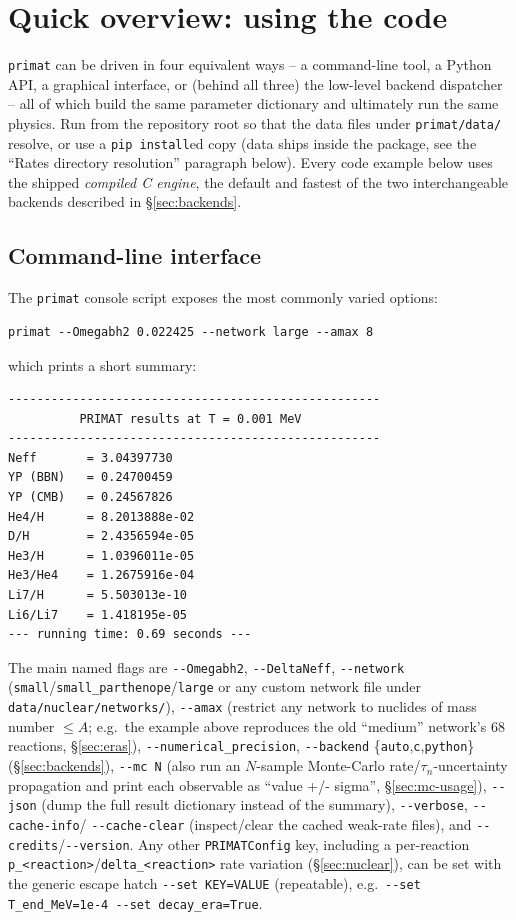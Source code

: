 \documentclass[11pt,a4paper]{article}
\newcommand{\code}[1]{\texttt{#1}}
\begin{document}
\section{Quick overview: using the code}\label{sec:usage}

\code{primat} can be driven in four equivalent ways -- a command-line tool, a
Python API, a graphical interface, or (behind all three) the low-level
backend dispatcher -- all of which build the same parameter dictionary and
ultimately run the same physics. Run from the repository root so that the
data files under \code{primat/data/} resolve, or use a \code{pip install}ed
copy (data ships inside the package, see the ``Rates directory resolution''
paragraph below). Every code example below uses the shipped \emph{compiled C
engine}, the default and fastest of the two interchangeable backends
described in \S\ref{sec:backends}.

\subsection{Command-line interface}
The \code{primat} console script exposes the most commonly varied options:
\begin{lstlisting}[style=sh]
primat --Omegabh2 0.022425 --network large --amax 8
\end{lstlisting}
which prints a short summary:
\begin{lstlisting}[style=sh]
----------------------------------------------------
          PRIMAT results at T = 0.001 MeV
----------------------------------------------------
Neff       = 3.04397730
YP (BBN)   = 0.24700459
YP (CMB)   = 0.24567826
He4/H      = 8.2013888e-02
D/H        = 2.4356594e-05
He3/H      = 1.0396011e-05
He3/He4    = 1.2675916e-04
Li7/H      = 5.503013e-10
Li6/Li7    = 1.418195e-05
--- running time: 0.69 seconds ---
\end{lstlisting}
The main named flags are \code{-{}-Omegabh2}, \code{-{}-DeltaNeff},
\code{-{}-network} (\code{small}/\code{small\_parthenope}/\code{large} or any
custom network file under \code{data/nuclear/networks/}), \code{-{}-amax}
(restrict any network to nuclides of mass number $\le A$; e.g.\ the example
above reproduces the old ``medium'' network's 68 reactions, \S\ref{sec:eras}),
\code{-{}-numerical\_precision}, \code{-{}-backend}
\{\code{auto},\code{c},\code{python}\} (\S\ref{sec:backends}),
\code{-{}-mc N} (also run an $N$-sample Monte-Carlo rate/$\tau_n$-uncertainty
propagation and print each observable as ``value +/- sigma'',
\S\ref{sec:mc-usage}), \code{-{}-json} (dump the full result dictionary
instead of the summary), \code{-{}-verbose}, \code{-{}-cache-info}/
\code{-{}-cache-clear} (inspect/clear the cached weak-rate files), and
\code{-{}-credits}/\code{-{}-version}. Any other \code{PRIMATConfig} key,
including a per-reaction \code{p\_<reaction>}/\code{delta\_<reaction>} rate
variation (\S\ref{sec:nuclear}), can be set with the generic escape hatch
\code{-{}-set KEY=VALUE} (repeatable), e.g.\
\code{-{}-set T\_end\_MeV=1e-4 -{}-set decay\_era=True}.
\end{document}
